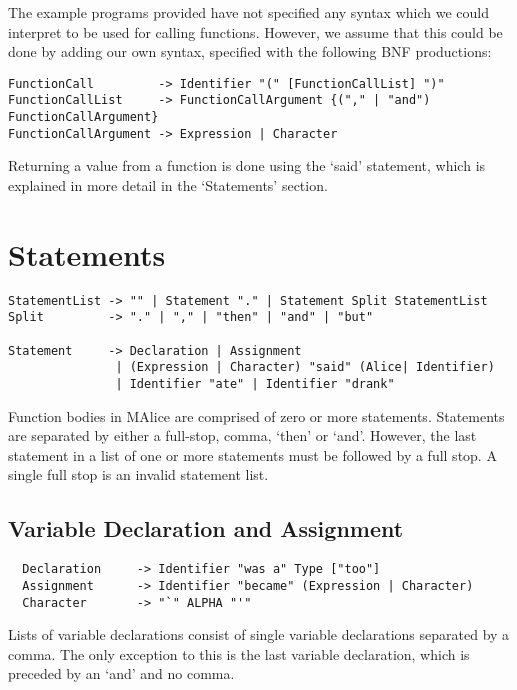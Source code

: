 \documentclass[a4wide, 11pt]{article}
\begin{document}
The example programs provided have not specified any syntax which we could interpret to be used for calling functions. However, we assume that this could be done by adding our own syntax, specified with the following BNF productions:

\begin{verbatim}
FunctionCall         -> Identifier "(" [FunctionCallList] ")"
FunctionCallList     -> FunctionCallArgument {("," | "and") FunctionCallArgument}
FunctionCallArgument -> Expression | Character
\end{verbatim}

Returning a value from a function is done using the `said' statement, which is explained in more detail in the `Statements' section.

\section{Statements}

\begin{verbatim}
StatementList -> "" | Statement "." | Statement Split StatementList
Split         -> "." | "," | "then" | "and" | "but"

Statement     -> Declaration | Assignment
               | (Expression | Character) "said" (Alice| Identifier)
               | Identifier "ate" | Identifier "drank"
\end{verbatim}

Function bodies in MAlice are comprised of zero or more statements. Statements are separated by either a full-stop, comma, `then' or `and'. However, the last statement in a list of one or more statements must be followed by a full stop. A single full stop is an invalid statement list.

\subsection{Variable Declaration and Assignment}

\begin{verbatim}
  Declaration     -> Identifier "was a" Type ["too"]
  Assignment      -> Identifier "became" (Expression | Character)
  Character       -> "`" ALPHA "'"
\end{verbatim}

Lists of variable declarations consist of single variable declarations separated by a comma. The only exception to this is the last variable declaration, which is preceded by an `and' and no comma.
\end{document}

